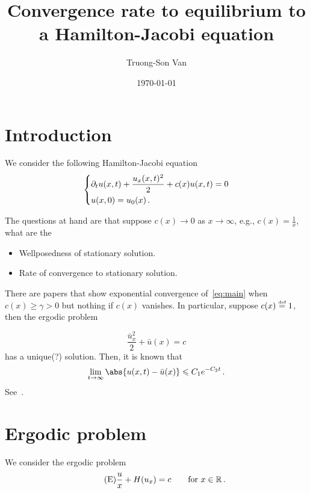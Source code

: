 \documentclass[12pt]{article}
\title{ Convergence rate to equilibrium to a Hamilton-Jacobi equation }
\author{Truong-Son Van}
\affil{Carnegie Mellon University}
\date{\today}
\begin{document}
\maketitle

\section{Introduction}
We consider the following Hamilton-Jacobi equation 
\begin{equation} \label{eq:main}
    \begin{dcases}
        \partial_t u(x,t) + \frac{u_x(x,t)^2}{2} + c(x)u(x,t) = 0     \\
        u(x,0) = u_0(x) \,.
    \end{dcases}
\end{equation}

The questions at hand are that suppose $c(x) \to 0$ as $x\to \infty$, e.g., $c(x) = \frac{1}{x}$, what are the
\begin{itemize}
    \item Wellposedness of stationary solution.
    \item Rate of convergence to stationary solution.
\end{itemize}

There are papers that show exponential convergence of~\eqref{eq:main} when $c(x) \geq \gamma >0$ but nothing if $c(x)$ vanishes. In particular, suppose $c(x) \stackrel{\scriptscriptstyle\textup{def}}{=} 1 $, then the ergodic problem 

\begin{equation}
    \frac{\bar u_x^2}{2} + \bar u(x) = c 
\end{equation}
has a unique(?) solution.
Then, it is known that 
\begin{equation*}
    \lim_{t\to\infty} \abs{ u(x,t) - \bar u(x)} \leq C_1e^{-C_2t} \,.
\end{equation*}
See~\cite{FujitaLoreti2009}.

\section{Ergodic problem}
We consider the ergodic problem 
\begin{equation}\label{eq:ergodic}
    \tag{E}
    \frac{u}{x} + H(u_x) = c \qquad \text{for } x\in \mathbb{R}\,.
\end{equation}
\end{document}
